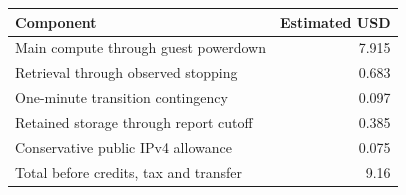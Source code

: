 \begin{tabular}{@{}lr@{}}
\toprule
Component & Estimated USD \\
\midrule
Main compute through guest powerdown & 7.915 \\
Retrieval through observed stopping & 0.683 \\
One-minute transition contingency & 0.097 \\
Retained storage through report cutoff & 0.385 \\
Conservative public IPv4 allowance & 0.075 \\
Total before credits, tax and transfer & 9.16 \\
\bottomrule
\end{tabular}
